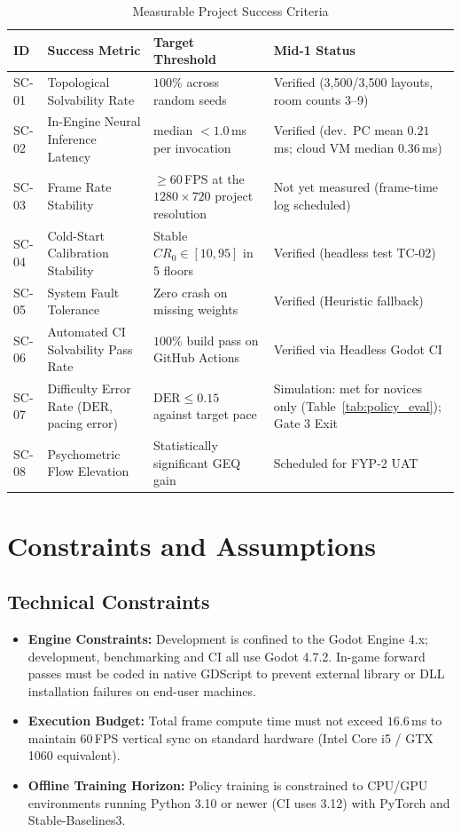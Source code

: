 \begin{table}[!htbp]
\centering
\caption{Measurable Project Success Criteria}
\label{tab:success_criteria}
\small
\begin{tabular}{p{}p{}p{}p{}}
\toprule
\textbf{ID} & \textbf{Success Metric} & \textbf{Target Threshold} & \textbf{Mid-1 Status} \\
\midrule
SC-01 & Topological Solvability Rate & $100\%$ across random seeds & Verified (3,500/3,500 layouts, room counts 3--9) \\
SC-02 & In-Engine Neural Inference Latency & median $<1.0$\,ms per invocation & Verified (dev.\ PC mean $0.21$\,ms; cloud VM median $0.36$\,ms) \\
SC-03 & Frame Rate Stability & $\ge 60$\,FPS at the $1280\times720$ project resolution & Not yet measured (frame-time log scheduled) \\
SC-04 & Cold-Start Calibration Stability & Stable $CR_0 \in [10, 95]$ in 5 floors & Verified (headless test TC-02) \\
SC-05 & System Fault Tolerance & Zero crash on missing weights & Verified (Heuristic fallback) \\
SC-06 & Automated CI Solvability Pass Rate & $100\%$ build pass on GitHub Actions & Verified via Headless Godot CI \\
SC-07 & Difficulty Error Rate ($\text{DER}$, pacing error) & $\text{DER} \le 0.15$ against target pace & Simulation: met for novices only (Table~\ref{tab:policy_eval}); Gate 3 Exit \\
SC-08 & Psychometric Flow Elevation & Statistically significant GEQ gain & Scheduled for FYP-2 UAT \\
\bottomrule
\end{tabular}
\end{table}

\section{Constraints and Assumptions}
\subsection*{Technical Constraints}
\begin{itemize}
    \item \textbf{Engine Constraints:} Development is confined to the Godot Engine 4.x; development, benchmarking and CI all use Godot 4.7.2. In-game forward passes must be coded in native GDScript to prevent external library or DLL installation failures on end-user machines.
    \item \textbf{Execution Budget:} Total frame compute time must not exceed $16.6$\,ms to maintain 60\,FPS vertical sync on standard hardware (Intel Core i5 / GTX 1060 equivalent).
    \item \textbf{Offline Training Horizon:} Policy training is constrained to CPU/GPU environments running Python 3.10 or newer (CI uses 3.12) with PyTorch and Stable-Baselines3.
\end{itemize}

